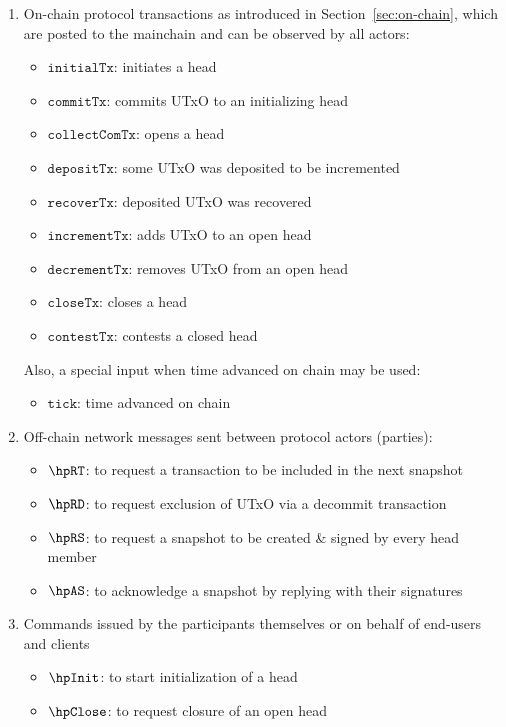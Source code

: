 \begin{enumerate}
  \item On-chain protocol transactions as introduced in
        Section~\ref{sec:on-chain}, which are posted to the mainchain and can be
        observed by all actors:
        \begin{itemize}
          \item $\mathtt{initialTx}$: initiates a head
          \item $\mathtt{commitTx}$: commits UTxO to an initializing head
          \item $\mathtt{collectComTx}$: opens a head
          \item $\mathtt{depositTx}$: some UTxO was deposited to be incremented
          \item $\mathtt{recoverTx}$: deposited UTxO was recovered
          \item $\mathtt{incrementTx}$: adds UTxO to an open head
          \item $\mathtt{decrementTx}$: removes UTxO from an open head
          \item $\mathtt{closeTx}$: closes a head
          \item $\mathtt{contestTx}$: contests a closed head
        \end{itemize}
        Also, a special input when time advanced on chain may be used:
        \begin{itemize}
          \item $\mathtt{tick}$: time advanced on chain
        \end{itemize}
  
  \item Off-chain network messages sent between protocol actors (parties):
  \begin{itemize}
    \item $\hpRT$: to request a transaction to be included in the next snapshot
    \item $\hpRD$: to request exclusion of UTxO via a decommit transaction
    \item $\hpRS$: to request a snapshot to be created \& signed by every head member
    \item $\hpAS$: to acknowledge a snapshot by replying with their signatures
  \end{itemize}
  \item Commands issued by the participants themselves or on behalf of end-users and clients
  \begin{itemize}
    \item $\hpInit$: to start initialization of a head
    \item $\hpClose$: to request closure of an open head
  \end{itemize}
\end{enumerate}

